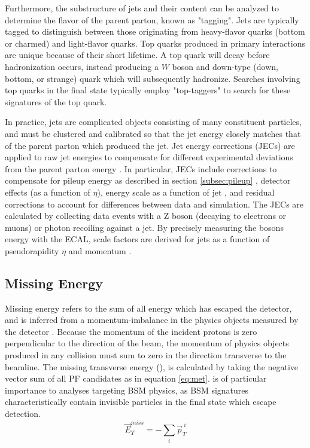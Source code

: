 Furthermore, the substructure of jets and their content can be analyzed to determine the flavor of the parent parton, known as "tagging". Jets are typically tagged to distinguish between those originating from heavy-flavor quarks (bottom or charmed) and light-flavor quarks. Top quarks produced in primary interactions are unique because of their short lifetime. A top quark will decay before hadronization occurs, instead producing a $W$ boson and down-type (down, bottom, or strange) quark which will subsequently hadronize. Searches involving top quarks in the final state typically employ "top-taggers" to search for these signatures of the top quark.

In practice, jets are complicated objects consisting of many constituent particles, and must be clustered and calibrated so that the jet energy closely matches that of the parent parton which produced the jet. Jet energy corrections (JECs) are applied to raw jet energies to compensate for different experimental deviations from the parent parton energy \cite{Khachatryan:2016kdb,CMS-DP-2016-020}. In particular, JECs include corrections to compensate for pileup energy as described in section \ref{subsec:pileup} \cite{Cacciari:2007fd}, detector effects (as a function of $\eta$), energy scale as a function of jet \pt, and residual corrections to account for differences between data and simulation. The JECs are calculated by collecting data events with a Z boson (decaying to electrons or muons) or photon recoiling against a jet. By precisely measuring the bosons energy with the ECAL, scale factors are derived for jets as a function of pseudorapidity $\eta$ and momentum \pt. 

\subsection{Missing Energy}
\label{subsec:met}
Missing energy refers to the sum of all energy which has escaped the detector, and is inferred from a momentum-imbalance in the physics objects measured by the detector \cite{Chatrchyan:2011tn}. Because the momentum of the incident protons is zero perpendicular to the direction of the beam, the momentum of physics objects produced in any collision must sum to zero in the direction transverse to the beamline. The missing transverse energy (\MET), is calculated by taking the negative vector sum of all PF candidates as in equation \ref{eq:met}. \MET is of particular importance to analyses targeting BSM physics, as BSM signatures characteristically contain invisible particles in the final state which escape detection.
\begin{equation}
	\label{eq:met}
	\vec{E}_T^{miss}=-\sum_i^{} \vec{p}_T^{\: i}
\end{equation}

